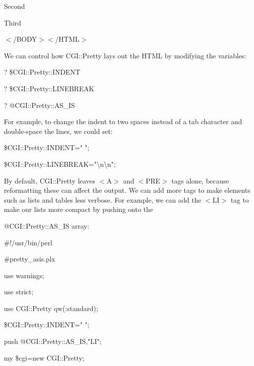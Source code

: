 \documentclass[a4paper,11pt]{book}
\begin{document}
\noindent Second

\noindent 

\noindent 

\noindent Third

\noindent $<$/BODY$>$$<$/HTML$>$

\noindent 

\noindent We can control how CGI::Pretty lays out the HTML by modifying the variables:

\noindent 

\noindent ? \$CGI::Pretty::INDENT

\noindent 

\noindent ? \$CGI::Pretty::LINEBREAK

\noindent 

\noindent ? @CGI::Pretty::AS\_IS

\noindent 

\noindent For example, to change the indent to two spaces instead of a tab character and double-space the lines, we could set:

\noindent 

\noindent \$CGI::Pretty::INDENT="  ";

\noindent \$CGI::Pretty::LINEBREAK="\textbackslash n\textbackslash n";

\noindent 

\noindent By  default,  CGI::Pretty leaves  $<$A$>$ and  $<$PRE$>$ tags  alone,  because  reformatting  these  can affect the output.  We can add  more  tags  to  make  elements  such  as  lists  and tables  less  verbose. For example,  we can add the $<$LI$>$ tag to make our lists more compact by pushing onto the

\noindent @CGI::Pretty::AS\_IS array:

\noindent 

\noindent 

\noindent \#!/usr/bin/perl

\noindent \#pretty\_asis.plx

\noindent use warnings;

\noindent use strict;

\noindent use CGI::Pretty qw(:standard);

\noindent 

\noindent \$CGI::Pretty::INDENT="  ";

\noindent push @CGI::Pretty::AS\_IS,"LI";

\noindent 

\noindent my \$cgi=new CGI::Pretty;
\end{document}
